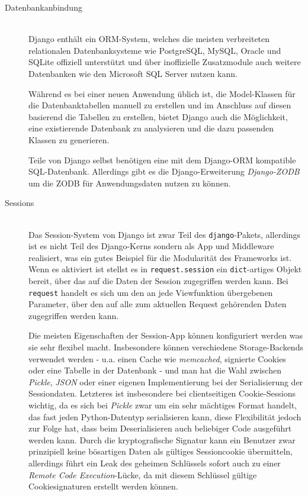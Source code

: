 \begin{description}



\item[Datenbankanbindung] \hfill \\
Django enthält ein ORM-System, welches die meisten verbreiteten relationalen Datenbanksysteme wie
PostgreSQL, MySQL, Oracle und SQLite offiziell unterstützt und über inoffizielle Zusatzmodule auch
weitere Datenbanken wie den Microsoft SQL Server nutzen kann.

Während es bei einer neuen Anwendung üblich ist, die Model-Klassen für die Datenbanktabellen manuell
zu erstellen und im Anschluss auf diesen basierend die Tabellen zu erstellen, bietet Django auch die
Möglichkeit, eine existierende Datenbank zu analysieren und die dazu passenden Klassen zu
generieren.

Teile von Django selbst benötigen eine mit dem Django-ORM kompatible SQL-Datenbank. Allerdings gibt
es die Django-Erweiterung \emph{Django-ZODB} um die ZODB für Anwendungsdaten nutzen zu können.


\item[Sessions] \hfill \\
Das Session-System von Django ist zwar Teil des \lstinline{django}-Pakets, allerdings ist es nicht
Teil des Django-Kerns sondern als App und Middleware realisiert, was ein gutes Beispiel für die
Modularität des Frameworks ist. Wenn es aktiviert ist stellst es in \lstinline{request.session} ein
\lstinline{dict}-artiges Objekt bereit, über das auf die Daten der Session zugegriffen werden kann.
Bei \lstinline{request} handelt es sich um den an jede Viewfunktion übergebenen Parameter, über den
auf alle zum aktuellen Request gehörenden Daten zugegriffen werden kann.

Die meisten Eigenschaften der Session-App können konfiguriert werden was sie sehr flexibel macht.
Insbesondere können verschiedene Storage-Backends verwendet werden - u.a. einen Cache wie
\emph{memcached}, signierte Cookies oder eine Tabelle in der Datenbank - und man hat die Wahl
zwischen \emph{Pickle}, \emph{JSON} oder einer eigenen Implementierung bei der Serialisierung der
Sessiondaten. Letzteres ist insbesondere bei clientseitigen Cookie-Sessions wichtig, da es sich bei
\emph{Pickle} zwar um ein sehr mächtiges Format handelt, das fast jeden Python-Datentyp
serialisieren kann, diese Flexibilität jedoch zur Folge hat, dass beim Deserialisieren auch
beliebiger Code ausgeführt werden kann. Durch die kryptografische Signatur kann ein Benutzer zwar
prinzipiell keine bösartigen Daten als gültiges Sessioncookie übermitteln, allerdings führt ein Leak
des geheimen Schlüssels sofort auch zu einer \emph{Remote Code Execution}-Lücke, da mit diesem
Schlüssel gültige Cookiesignaturen erstellt werden können.


\end{description}
